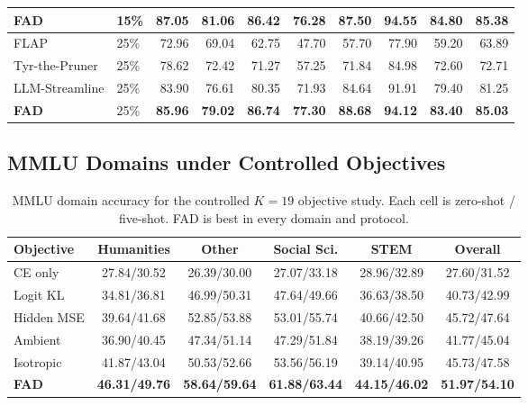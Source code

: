\documentclass{article}
\theoremstyle{plain}
\theoremstyle{definition}
\theoremstyle{remark}
\begin{document}
\begin{table}[H]
{\begin{tabular}{@{}llrrrrrrrr@{}}
\textbf{FAD} & 15\% & \textbf{87.05} & \textbf{81.06} & \textbf{86.42}
& \textbf{76.28} & \textbf{87.50} & \textbf{94.55} & \textbf{84.80} & \textbf{85.38}\\
\midrule
FLAP & 25\% & 72.96 & 69.04 & 62.75 & 47.70 & 57.70 & 77.90 & 59.20 & 63.89\\
Tyr-the-Pruner & 25\% & 78.62 & 72.42 & 71.27 & 57.25 & 71.84 & 84.98 & 72.60 & 72.71\\
LLM-Streamline & 25\% & 83.90 & 76.61 & 80.35 & 71.93 & 84.64 & 91.91 & 79.40 & 81.25\\
\textbf{FAD} & 25\% & \textbf{85.96} & \textbf{79.02} & \textbf{86.74}
& \textbf{77.30} & \textbf{88.68} & \textbf{94.12} & \textbf{83.40} & \textbf{85.03}\\
\bottomrule
\end{tabular}%
}
\end{table}

\subsection{MMLU Domains under Controlled Objectives}
\label{app:mmlu-domains-objectives}

\begin{table}[H]
\caption{MMLU domain accuracy for the controlled $K=19$ objective study.  Each
cell is zero-shot / five-shot.  FAD is best in every domain and protocol.}
\label{tab:app-objective-domains}
\centering
\footnotesize
\setlength{\tabcolsep}{4.2pt}
\renewcommand{\arraystretch}{1.04}
\begin{tabular}{@{}lccccc@{}}
\toprule
\textbf{Objective} & \textbf{Humanities} & \textbf{Other}
& \textbf{Social Sci.} & \textbf{STEM} & \textbf{Overall}\\
\midrule
CE only & 27.84/30.52 & 26.39/30.00 & 27.07/33.18 & 28.96/32.89 & 27.60/31.52\\
Logit KL & 34.81/36.81 & 46.99/50.31 & 47.64/49.66 & 36.63/38.50 & 40.73/42.99\\
Hidden MSE & 39.64/41.68 & 52.85/53.88 & 53.01/55.74 & 40.66/42.50 & 45.72/47.64\\
Ambient & 36.90/40.45 & 47.34/51.14 & 47.29/51.84 & 38.19/39.26 & 41.77/45.04\\
Isotropic & 41.87/43.04 & 50.53/52.66 & 53.56/56.19 & 39.14/40.95 & 45.73/47.58\\
\textbf{FAD} & \textbf{46.31/49.76} & \textbf{58.64/59.64}
& \textbf{61.88/63.44} & \textbf{44.15/46.02} & \textbf{51.97/54.10}\\
\bottomrule
\end{tabular}
\end{table}
\end{document}
